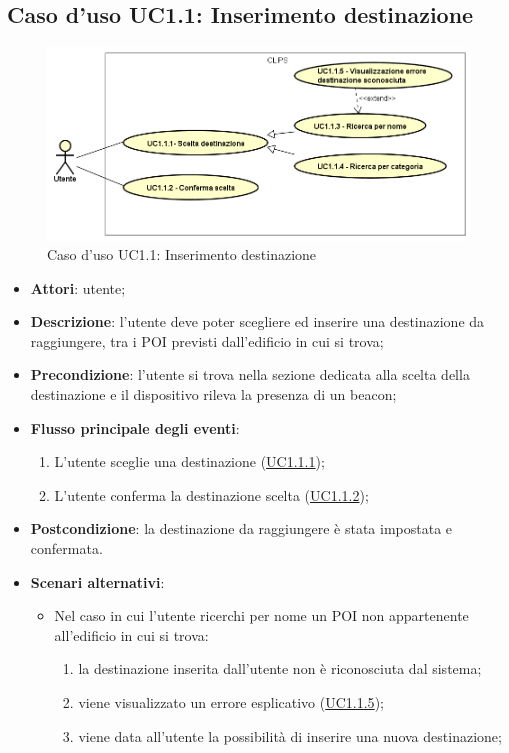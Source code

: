 \documentclass[../AnalisiDeiRequisiti.tex]{subfiles}
\begin{document}
\subsection{Caso d'uso UC1.1: Inserimento destinazione}

        \begin{figure}[H]
            \centering
            \includegraphics[scale=0.95, width=\textwidth]{img/UC1-1.png}
            \caption{Caso d'uso UC1.1: Inserimento destinazione}\label{fig:UC1.1} 
        \end{figure}
\begin{itemize}
\item \textbf{Attori}: utente;
\item \textbf{Descrizione}: l'utente deve poter scegliere ed inserire una destinazione da raggiungere, tra i POI previsti dall'edificio in cui si trova; 
      \item \textbf{Precondizione}: l'utente si trova nella sezione dedicata alla scelta della destinazione e il dispositivo rileva la presenza di un beacon;

        \item \textbf{Flusso principale degli eventi}:
          \begin{enumerate}
          \item L'utente sceglie una destinazione  (\hyperlink{UC1.1.1}{UC1.1.1});
          \item L'utente conferma la destinazione scelta  (\hyperlink{UC1.1.2}{UC1.1.2});

      \end{enumerate}
    \item \textbf{Postcondizione}: la destinazione da raggiungere è stata impostata e confermata.
     \item \textbf{Scenari alternativi}: 
      \begin{itemize}
       \item Nel caso in cui l'utente ricerchi per nome un POI non appartenente all'edificio in cui si trova: 
       \begin{enumerate}
          \item la destinazione inserita dall'utente non è riconosciuta dal sistema;
          \item viene visualizzato un errore esplicativo (\hyperlink{UC1.1.5}{UC1.1.5});
          \item viene data all’utente la possibilità di inserire una nuova destinazione;
       \end{enumerate}
      \end{itemize}
  \end{itemize}
\hypertarget{UC1.1.1}{}
\end{document}
